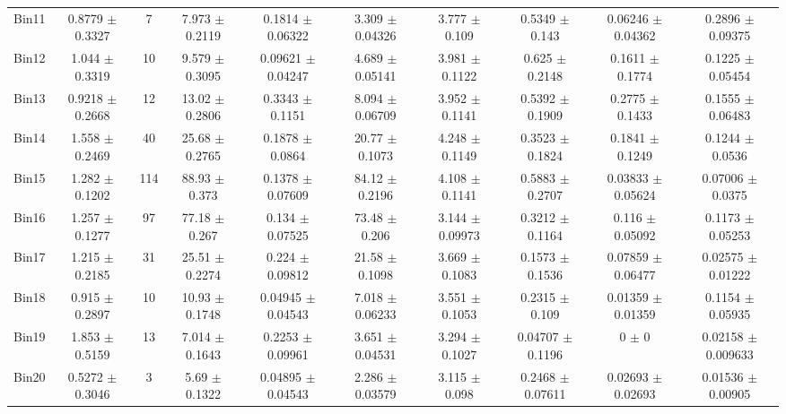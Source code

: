 \begin{tabular}{@{\extracolsep{4pt}}lccccccccc@{}}
     Bin11 & 0.8779 $\pm$ 0.3327 & 7 & 7.973 $\pm$ 0.2119 & 0.1814 $\pm$ 0.06322 & 3.309 $\pm$ 0.04326 & 3.777 $\pm$ 0.109 & 0.5349 $\pm$ 0.143 & 0.06246 $\pm$ 0.04362 & 0.2896 $\pm$ 0.09375 \\ 
     Bin12 & 1.044 $\pm$ 0.3319 & 10 & 9.579 $\pm$ 0.3095 & 0.09621 $\pm$ 0.04247 & 4.689 $\pm$ 0.05141 & 3.981 $\pm$ 0.1122 & 0.625 $\pm$ 0.2148 & 0.1611 $\pm$ 0.1774 & 0.1225 $\pm$ 0.05454 \\ 
     Bin13 & 0.9218 $\pm$ 0.2668 & 12 & 13.02 $\pm$ 0.2806 & 0.3343 $\pm$ 0.1151 & 8.094 $\pm$ 0.06709 & 3.952 $\pm$ 0.1141 & 0.5392 $\pm$ 0.1909 & 0.2775 $\pm$ 0.1433 & 0.1555 $\pm$ 0.06483 \\ 
     Bin14 & 1.558 $\pm$ 0.2469 & 40 & 25.68 $\pm$ 0.2765 & 0.1878 $\pm$ 0.0864 & 20.77 $\pm$ 0.1073 & 4.248 $\pm$ 0.1149 & 0.3523 $\pm$ 0.1824 & 0.1841 $\pm$ 0.1249 & 0.1244 $\pm$ 0.0536 \\ 
     Bin15 & 1.282 $\pm$ 0.1202 & 114 & 88.93 $\pm$ 0.373 & 0.1378 $\pm$ 0.07609 & 84.12 $\pm$ 0.2196 & 4.108 $\pm$ 0.1141 & 0.5883 $\pm$ 0.2707 & 0.03833 $\pm$ 0.05624 & 0.07006 $\pm$ 0.0375 \\ 
     Bin16 & 1.257 $\pm$ 0.1277 & 97 & 77.18 $\pm$ 0.267 & 0.134 $\pm$ 0.07525 & 73.48 $\pm$ 0.206 & 3.144 $\pm$ 0.09973 & 0.3212 $\pm$ 0.1164 & 0.116 $\pm$ 0.05092 & 0.1173 $\pm$ 0.05253 \\ 
     Bin17 & 1.215 $\pm$ 0.2185 & 31 & 25.51 $\pm$ 0.2274 & 0.224 $\pm$ 0.09812 & 21.58 $\pm$ 0.1098 & 3.669 $\pm$ 0.1083 & 0.1573 $\pm$ 0.1536 & 0.07859 $\pm$ 0.06477 & 0.02575 $\pm$ 0.01222 \\ 
     Bin18 & 0.915 $\pm$ 0.2897 & 10 & 10.93 $\pm$ 0.1748 & 0.04945 $\pm$ 0.04543 & 7.018 $\pm$ 0.06233 & 3.551 $\pm$ 0.1053 & 0.2315 $\pm$ 0.109 & 0.01359 $\pm$ 0.01359 & 0.1154 $\pm$ 0.05935 \\ 
     Bin19 & 1.853 $\pm$ 0.5159 & 13 & 7.014 $\pm$ 0.1643 & 0.2253 $\pm$ 0.09961 & 3.651 $\pm$ 0.04531 & 3.294 $\pm$ 0.1027 & 0.04707 $\pm$ 0.1196 & 0 $\pm$ 0 & 0.02158 $\pm$ 0.009633 \\ 
     Bin20 & 0.5272 $\pm$ 0.3046 & 3 & 5.69 $\pm$ 0.1322 & 0.04895 $\pm$ 0.04543 & 2.286 $\pm$ 0.03579 & 3.115 $\pm$ 0.098 & 0.2468 $\pm$ 0.07611 & 0.02693 $\pm$ 0.02693 & 0.01536 $\pm$ 0.00905 \\ 
\hline\hline
  \end{tabular}
